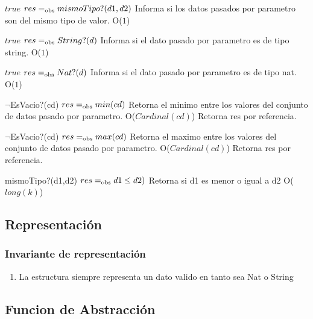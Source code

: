 
 {$true$}
 {$res =_{\mathrm{obs}} mismoTipo?(d1,d2)$}
 {Informa si los datos pasados por parametro son del mismo tipo de valor.}
 {O($1$)}
 {} 
 
 {$true$}
 {$res =_{\mathrm{obs}} String?(d)$}
 {Informa si el dato pasado por parametro es de tipo string.}
 {O($1$)}
 {} 
 
 {$true$}
 {$res =_{\mathrm{obs}} Nat?(d)$}
 {Informa si el dato pasado por parametro es de tipo nat.}
 {O($1$)}
 {}  
 
 {$\neg$EsVacio?(cd)}
 {$res =_{\mathrm{obs}} min(cd)$}
 {Retorna el minimo entre los valores del conjunto de datos pasado por parametro.}
 {O($Cardinal(cd)$)}
 {Retorna res por referencia.}

 {$\neg$EsVacio?(cd)}
 {$res =_{\mathrm{obs}} max(cd)$}
 {Retorna el maximo entre los valores del conjunto de datos pasado por parametro.}
 {O($Cardinal(cd)$)}
 {Retorna res por referencia.}

 {mismoTipo?(d1,d2)}
 {$res =_{\mathrm{obs}} d1 \leq d2)$}
 {Retorna si d1 es menor o igual a d2}
 {O($long(k)$)}
 {}

\subsection{Representación}


\subsubsection*{Invariante de representación}

\begin{enumerate}
  \item La estructura siempre representa un dato valido en tanto \alpha sea Nat o String
\end{enumerate}


\subsection*{Funcion de Abstracción}

